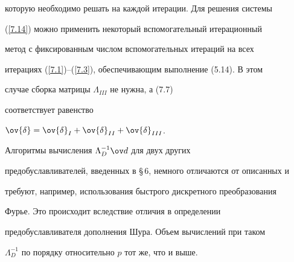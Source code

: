 которую необходимо решать на каждой итерации. Для решения системы 


(\ref{7.14}) можно применить некоторый вспомогательный итерационный 


метод с фиксированным числом вспомогательных итераций на всех 


итерациях (\ref{7.1})--(\ref{7.3}), обеспечивающим выполнение (5.14). В этом 


случае сборка матрицы ${\Lambda}_{III}$ не нужна, а (7.7) 


соответствует равенство 


$\ov{ \delta}=\ov{ \delta}_I+\ov{ \delta}_{II}+\ov{ \delta}_{III}$. 





Алгоритмы вычисления ${\Lambda}^{-1}_D \ov d$ для двух других 


предобуславливателей, введенных в \S\,6, немного отличаются от описанных и 


требуют, например, использования быстрого дискретного преобразования 


Фурье. Это происходит вследствие отличия в определении 


предобуславливателя дополнения Шура. Объем вычислений при таком 


${\Lambda}^{-1}_D$ по порядку относительно $p$ тот же, что и выше. 





